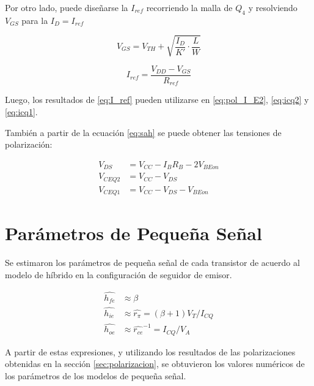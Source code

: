 Por otro lado, puede diseñarse la $I_{ref}$ recorriendo la malla de $Q_4$ y resolviendo $V_{GS}$ para la $I_D = I_{ref}$

\begin{equation}
    V_{GS} = V_{TH} + \sqrt{\frac{I_D}{K'}\cdot\frac{L}{W}}
\end{equation}

\begin{equation}
    I_{ref}=\frac{V_{DD}-V_{GS}}{R_{ref}}
    \label{eq:I_ref}
\end{equation}

Luego, los resultados de \eqref{eq:I_ref} pueden utilizarse en \eqref{eq:pol_I_E2}, \eqref{eq:icq2} y \eqref{eq:icq1}.

También a partir de la ecuación	 \eqref{eq:sah} se puede obtener las tensiones de polarización:

\begin{align}
    V_{DS} &= V_{CC} - I_B R_B - 2V_{BEon} \\
    V_{CEQ2} &= V_{CC} - V_{DS} \\
    V_{CEQ1} &= V_{CC} - V_{DS} - V_{BEon}
\end{align}

\section{Parámetros de Pequeña Señal}

Se estimaron los parámetros de pequeña señal de cada transistor de acuerdo al modelo de híbrido en la configuración de seguidor de emisor.

\begin{align}
    \hat{h_{fe}} &\approx \beta \\
    \hat{h_{ie}} &\approx \hat{r_\pi} = (\beta+1) V_T/I_{CQ} \\
    \hat{h_{oe}} &\approx \hat{r_{ce}}^{-1} = I_{CQ}/V_A
\end{align}


A partir de estas expresiones, y utilizando los resultados de las polarizaciones obtenidas en la sección \ref{sec:polarizacion}, se obtuvieron los valores numéricos de los parámetros de los modelos de pequeña señal.

